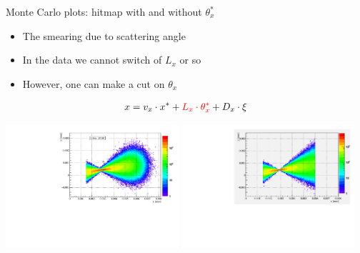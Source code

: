\documentclass{beamer}
\begin{document}
\begin{frame}\scriptsize
	\begin{block}{Monte Carlo plots: hitmap with and without $\theta_{x}^{*}$}
    		\begin{itemize}
			\item The smearing due to scattering angle
			\item In the data we cannot switch of $L_{x}$ or so
			\item However, one can make a cut on $\theta_{x}$
		\end{itemize}
		\begin{align}
			x = v_{x}\cdot x^{*} + {\color{red} L_{x}\cdot \theta^{*}_{x}}+D_{x}\cdot \xi 	
		\end{align}

             \includegraphics[width=0.48\textwidth]{x_y_hitmap_near.pdf}
             \includegraphics[width=0.48\textwidth]{coll.pdf}
	\end{block}
	
\end{frame}
\end{document}
